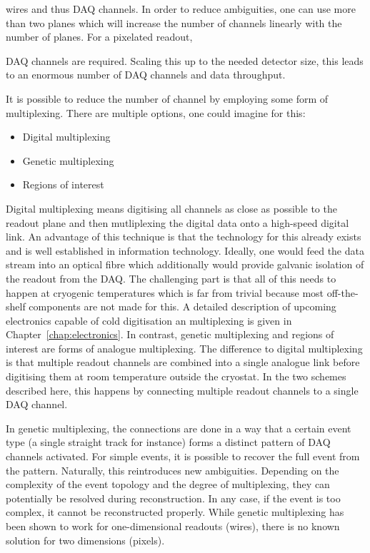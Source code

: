 
wires and thus DAQ channels.
In order to reduce ambiguities, one can use more than two planes which will increase the number of channels linearly with the number of planes.
For a pixelated readout,


DAQ channels are required.
Scaling this up to the needed detector size, this leads to an enormous number of DAQ channels and data throughput.

It is possible to reduce the number of channel by employing some form of multiplexing.
There are multiple options, one could imagine for this:
\begin{itemize}
	\item Digital multiplexing
	\item Genetic multiplexing
	\item Regions of interest
\end{itemize}

Digital multiplexing means digitising all channels as close as possible to the readout plane and then mutliplexing the digital data onto a high-speed digital link.
An advantage of this technique is that the technology for this already exists and is well established in information technology.
Ideally, one would feed the data stream into an optical fibre which additionally would provide galvanic isolation of the readout from the DAQ.
The challenging part is that all of this needs to happen at cryogenic temperatures which is far from trivial because most off-the-shelf components are not made for this.
A detailed description of upcoming electronics capable of cold digitisation an multiplexing is given in Chapter~\ref{chap:electronics}.
In contrast, genetic multiplexing and regions of interest are forms of analogue multiplexing.
The difference to digital multiplexing is that multiple readout channels are combined into a single analogue link before digitising them at room temperature outside the cryostat.
In the two schemes described here, this happens by connecting multiple readout channels to a single DAQ channel.

In genetic multiplexing, the connections are done in a way that a certain event type (a single straight track for instance) forms a distinct pattern of DAQ channels activated.
For simple events, it is possible to recover the full event from the pattern.
Naturally, this reintroduces new ambiguities.
Depending on the complexity of the event topology and the degree of multiplexing, they can potentially be resolved during reconstruction.
In any case, if the event is too complex, it cannot be reconstructed properly.
While genetic multiplexing has been shown to work for one-dimensional readouts (wires), there is no known solution for two dimensions (pixels).

